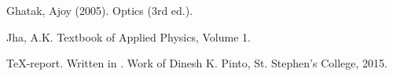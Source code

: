 \documentclass{dkpinto-report}
\begin{document}
\begin{thebibliography}{99}
Ghatak, Ajoy (2005). Optics (3rd ed.). 

Jha, A.K. Textbook of Applied Physics, Volume 1.

\TeX-report. Written in \LaTeXe. Work of Dinesh K. Pinto, St. Stephen's College, 2015.
\end{thebibliography}
\end{document}
